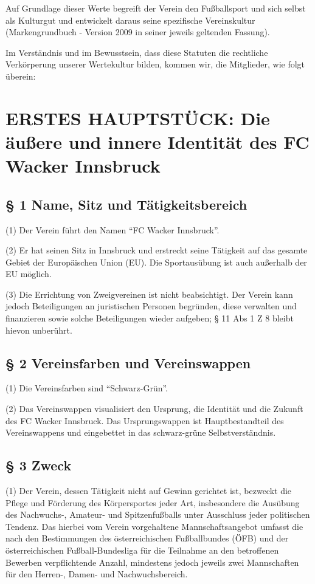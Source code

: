 \documentclass[10pt,a4paper]{article}
\begin{document}
Auf Grundlage dieser Werte begreift der Verein den Fußballsport und sich selbst als Kulturgut und entwickelt daraus seine spezifische Vereinskultur (Markengrundbuch - Version 2009 in seiner jeweils geltenden Fassung).

Im Verständnis und im Bewusstsein, dass diese Statuten die rechtliche Verkörperung unserer Wertekultur bilden, kommen wir, die Mitglieder, wie folgt überein:

\clearpage
\setlength{\parskip}{10pt}
\upshape

\section{ERSTES HAUPTSTÜCK: Die äußere und innere Identität des FC Wacker Innsbruck}

\subsection{§ 1
Name, Sitz und Tätigkeitsbereich}

(1)
Der Verein führt den Namen "`FC Wacker Innsbruck"'.

(2)
Er hat seinen Sitz in Innsbruck und erstreckt seine Tätigkeit auf das gesamte Gebiet der Europäischen Union (EU).
Die Sportausübung ist auch außerhalb der EU möglich.

(3)
Die Errichtung von Zweigvereinen ist nicht beabsichtigt.
Der Verein kann jedoch Beteiligungen an juristischen Personen begründen, diese verwalten und finanzieren sowie solche Beteiligungen wieder aufgeben; § 11 Abs 1 Z 8 bleibt hievon unberührt.

\subsection{§ 2
Vereinsfarben und Vereinswappen}

(1)
Die Vereinsfarben sind "`Schwarz-Grün"'.

(2)
Das Vereinswappen visualisiert den Ursprung, die Identität und die Zukunft des FC Wacker Innsbruck.
Das Ursprungswappen ist Hauptbestandteil des Vereinswappens und eingebettet in das schwarz-grüne Selbstverständnis.

\subsection{§ 3
Zweck}

(1)
Der Verein, dessen Tätigkeit nicht auf Gewinn gerichtet ist, bezweckt die Pflege und Förderung des Körpersportes jeder Art, insbesondere die Ausübung des Nachwuchs-, Amateur- und Spitzenfußballs unter Ausschluss jeder politischen Tendenz.
Das hierbei vom Verein vorgehaltene Mannschaftsangebot umfasst die nach den Bestimmungen des österreichischen Fußballbundes (ÖFB) und der österreichischen Fußball-Bundesliga für die Teilnahme an den betroffenen Bewerben verpflichtende Anzahl, mindestens jedoch jeweils zwei Mannschaften für den Herren-, Damen- und Nachwuchsbereich.
\end{document}
